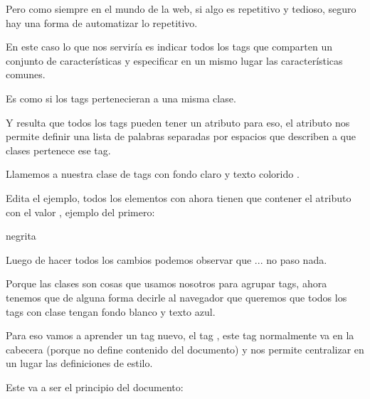 \documentclass[letterpaper,10pt,spanish]{sphinxmanual}
\begin{document}
Pero como siempre en el mundo de la web, si algo es repetitivo y tedioso,
seguro hay una forma de automatizar lo repetitivo.

En este caso lo que nos serviría es indicar todos los tags que comparten un
conjunto de características y especificar en un mismo lugar las características
comunes.

Es como si los tags pertenecieran a una misma clase.

Y resulta que todos los tags pueden tener un atributo para eso, el atributo
 nos permite definir una lista de palabras separadas por espacios que
describen a que clases pertenece ese tag.

Llamemos a nuestra clase de tags con fondo claro y texto colorido .

Edita el ejemplo, todos los elementos con  ahora tienen que contener el atributo  con el valor , ejemplo del primero:

%
\begin{sphinxVerbatim}[commandchars=\\\{\}]
 negrita
\end{sphinxVerbatim}

Luego de hacer todos los cambios podemos observar que ... no paso nada.

Porque las clases son cosas que usamos nosotros para agrupar tags, ahora
tenemos que de alguna forma decirle al navegador que queremos que todos los
tags con clase  tengan fondo blanco y texto azul.

Para eso vamos a aprender un tag nuevo, el tag , este tag normalmente va en
la cabecera (porque no define contenido del documento) y nos permite
centralizar en un lugar las definiciones de estilo.

Este va a ser el principio del documento:
\end{document}
